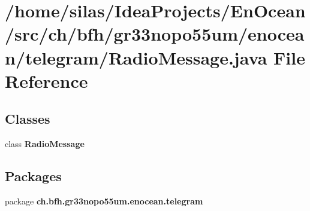 \section{/home/silas/\+Idea\+Projects/\+En\+Ocean/src/ch/bfh/gr33nopo55um/enocean/telegram/\+Radio\+Message.java File Reference}
\label{RadioMessage_8java}
\subsection*{Classes}
\begin{DoxyCompactItemize}
\item 
class {\bf Radio\+Message}
\end{DoxyCompactItemize}
\subsection*{Packages}
\begin{DoxyCompactItemize}
\item 
package {\bf ch.\+bfh.\+gr33nopo55um.\+enocean.\+telegram}
\end{DoxyCompactItemize}
